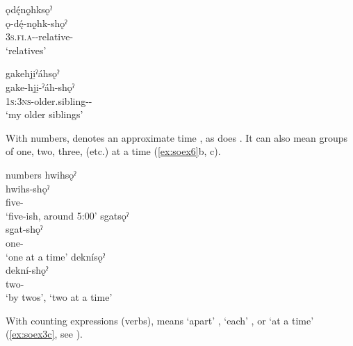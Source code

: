 
\ex ǫdę́nǫ̱hksǫˀ\\
\gll ǫ-dę́-nǫ̱hk-shǫˀ\\
 \textsc{3s.fi.a}-{\semireflexive}-relative-{\pluralizer}\\
\glt `relatives'


\ex gakehji̱ˀáhsǫˀ\\
\gll gake-hji̱-ˀáh-shǫˀ\\
 \textsc{1s:3ns}-older.sibling-{\diminutive}-{\pluralizer}\\
\glt `my older siblings'

\z
\z

\largerpage
With numbers,  {\pluralizer} denotes an approximate time , as does  {\pluralizer} . It can also mean groups of one, two, three, (etc.) at a time (\ref{ex:soex6}b, c).

\ea\label{ex:soex6} numbers
\ea hwihsǫˀ\\\label{ex:soex6a}
\gll hwihs-shǫˀ\\
 five-{\pluralizer}\\
\glt `five-ish, around 5:00'
\ex sgatsǫˀ\\\label{ex:soex6b}
\gll sgat-shǫˀ\\
 one-{\pluralizer}\\
\glt `one at a time'
\ex deknísǫˀ \\\label{ex:soex6c}
\gll dekní-shǫˀ \\
two-{\pluralizer}\\
\glt ‘by twos’, ‘two at a time' 
\z
\z

With counting expressions (verbs),  {\pluralizer} means ‘apart’ , ‘each’ , or ‘at a time’ (\ref{ex:soex3c}, see ).

